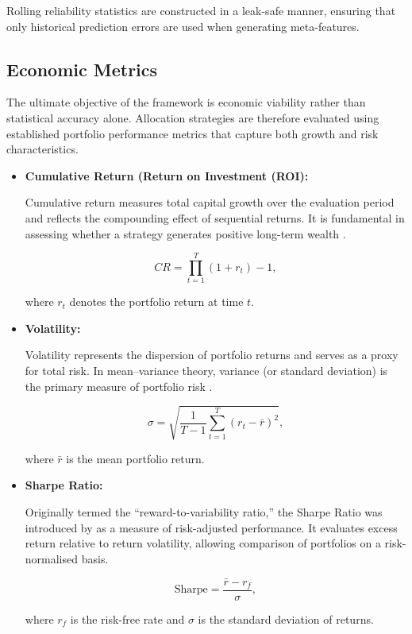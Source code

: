 \documentclass{l4proj}
\begin{document}
Rolling reliability statistics are constructed in a leak-safe manner, ensuring that only historical prediction errors are used when generating meta-features.

\subsection{Economic Metrics}

The ultimate objective of the framework is economic viability rather than statistical accuracy alone. Allocation strategies are therefore evaluated using established portfolio performance metrics that capture both growth and risk characteristics.

\begin{itemize}

\item \textbf{Cumulative Return (Return on Investment (ROI):}  

Cumulative return measures total capital growth over the evaluation period and reflects the compounding effect of sequential returns. It is fundamental in assessing whether a strategy generates positive long-term wealth \citep{Thorp1997, elton}.

\[
CR = \prod_{t=1}^{T} (1 + r_t) - 1,
\]

where $r_t$ denotes the portfolio return at time $t$.

\item \textbf{Volatility:}  

Volatility represents the dispersion of portfolio returns and serves as a proxy for total risk. In mean–variance theory, variance (or standard deviation) is the primary measure of portfolio risk \citep{markowitz1952}.

\[
\sigma = \sqrt{\frac{1}{T-1} \sum_{t=1}^{T} (r_t - \bar{r})^2},
\]

where $\bar{r}$ is the mean portfolio return.

\item \textbf{Sharpe Ratio:}  

Originally termed the ``reward-to-variability ratio,'' the Sharpe Ratio was introduced by \cite{sharperatio} as a measure of risk-adjusted performance. It evaluates excess return relative to return volatility, allowing comparison of portfolios on a risk-normalised basis.

\[
\text{Sharpe} = \frac{\bar{r} - r_f}{\sigma},
\]

where $r_f$ is the risk-free rate and $\sigma$ is the standard deviation of returns.


\end{itemize}
\end{document}
